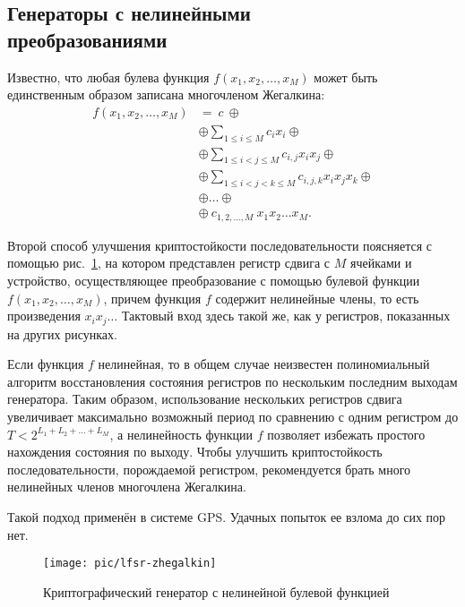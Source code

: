 \subsection[Генераторы с нелинейными преобразованиями]{Генераторы с нелинейными \protect\\ преобразованиями}

Известно, что любая булева функция $f(x_1, x_2,  \dots, x_M)$ может быть единственным образом записана многочленом Жегалкина:
\[ \begin{array}{ll}
    f(x_1, x_2, \dots, x_M) & = ~c~ \oplus \\
    & \oplus \sum\limits_{1 \leq i \leq M} c_i x_i \oplus \\
    & \oplus \sum\limits_{1 \leq i < j \leq M} c_{i,j} x_i x_j \oplus \\
    & \oplus \sum\limits_{1 \leq i < j < k \leq M} c_{i,j,k} x_i x_j x_k \oplus \\
    & \oplus \dots \oplus \\
    & \oplus ~ c_{1,2,\dots,M} ~ x_1 x_2 \dots x_M.
\end{array} \]


Второй способ улучшения криптостойкости последовательности поясняется с помощью рис.~\ref{fig:lfsr-zhegalkin}, на котором представлен регистр сдвига с $M$ ячейками и устройство, осуществляющее преобразование с помощью булевой функции $f(x_1, x_2, \dots, x_M)$, причем функция $f$ содержит нелинейные члены, то есть произведения $x_i x_j \dots$ Тактовый вход здесь такой же, как у регистров, показанных на других рисунках.

Если функция $f$ нелинейная, то в общем случае неизвестен полиномиальный алгоритм восстановления состояния регистров по нескольким последним выходам генератора. Таким образом, использование нескольких регистров сдвига увеличивает максимально возможный период по сравнению с одним регистром до $T < 2^{L_1 + L_2 + \dots + L_M}$, а нелинейность функции $f$ позволяет избежать простого нахождения состояния по выходу. Чтобы улучшить криптостойкость последовательности, порождаемой регистром, рекомендуется брать много нелинейных членов многочлена Жегалкина.

Такой подход применён в системе GPS. Удачных попыток ее взлома до сих пор нет.

\begin{figure}[!ht]
    \centering
	\texttt{[image: pic/lfsr-zhegalkin]}
    \caption{Криптографический генератор с нелинейной булевой функцией\label{fig:lfsr-zhegalkin}}
\end{figure}

